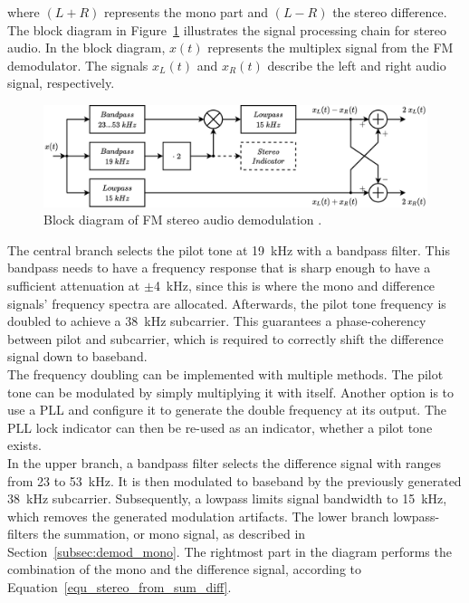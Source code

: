 \noindent
where $(L+R)$ represents the mono part and $(L-R)$ the stereo difference.\\

The block diagram in Figure~\ref{fig_bd_stereo_demod} illustrates the signal processing chain for stereo audio.
In the block diagram, $x(t)$ represents the multiplex signal from the FM demodulator.
The signals $x_L(t)$ and $x_R(t)$ describe the left and right audio signal, respectively.\\

\begin{figure}[!h]
  \centering
    \includegraphics[width=1.0\textwidth]{img/draw.io/bd_fm_demod_stereo_audio}
  \caption{Block diagram of FM stereo audio demodulation \cite{RoppelBegleitmaterial}.}
  \label{fig_bd_stereo_demod}
\end{figure}

The central branch selects the pilot tone at 19~kHz with a bandpass filter.
This bandpass needs to have a frequency response that is sharp enough to have a sufficient attenuation at $\pm$4~kHz, since this is where the mono and difference signals' frequency spectra are allocated.
Afterwards, the pilot tone frequency is doubled to achieve a 38~kHz subcarrier.
This guarantees a phase-coherency between pilot and subcarrier, which is required to correctly shift the difference signal down to baseband.\\

The frequency doubling can be implemented with multiple methods.
The pilot tone can be modulated by simply multiplying it with itself.
Another option is to use a PLL and configure it to generate the double frequency at its output.
The PLL lock indicator can then be re-used as an indicator, whether a pilot tone exists.\\

In the upper branch, a bandpass filter selects the difference signal with ranges from 23 to 53~kHz.
It is then modulated to baseband by the previously generated 38~kHz subcarrier.
Subsequently, a lowpass limits signal bandwidth to 15~kHz, which removes the generated modulation artifacts.
The lower branch lowpass-filters the summation, or mono signal, as described in Section~\ref{subsec:demod_mono}.
The rightmost part in the diagram performs the combination of the mono and the difference signal, according to Equation~\eqref{equ_stereo_from_sum_diff}.
